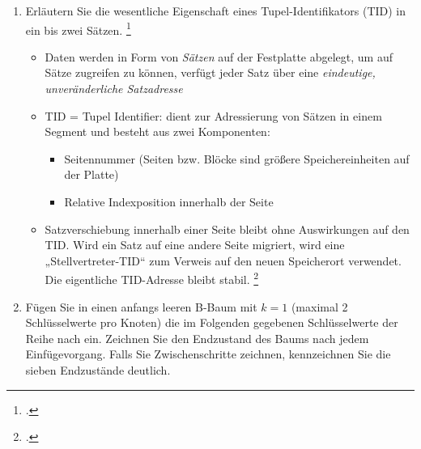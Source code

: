 \documentclass{lehramt-informatik-aufgabe}
\begin{document}

\begin{enumerate}


\item Erläutern Sie die wesentliche Eigenschaft eines
Tupel-Identifikators (TID) in ein bis zwei Sätzen.
\footcite{66114:2016:09}

\begin{liAntwort}
\begin{itemize}
\item Daten werden in Form von \emph{Sätzen} auf der Festplatte
abgelegt, um auf Sätze zugreifen zu können, verfügt jeder Satz über eine
\emph{eindeutige, unveränderliche Satzadresse}

\item TID = Tupel Identifier: dient zur Adressierung von Sätzen in einem
Segment und besteht aus zwei Komponenten:

\begin{itemize}
\item Seitennummer (Seiten bzw. Blöcke sind größere Speichereinheiten
auf der Platte)

\item Relative Indexposition innerhalb der Seite
\end{itemize}

\item Satzverschiebung innerhalb einer Seite bleibt ohne Auswirkungen
auf den TID. Wird ein Satz auf eine andere Seite migriert, wird eine
„Stellvertreter-TID“ zum Verweis auf den neuen Speicherort verwendet.
Die eigentliche TID-Adresse bleibt stabil.
\footcite[Seite 219]{kemper}
\end{itemize}
\end{liAntwort}


\item Fügen Sie in einen anfangs leeren B-Baum mit $k = 1$ (maximal 2
Schlüsselwerte pro Knoten) die im Folgenden gegebenen Schlüsselwerte der
Reihe nach ein. Zeichnen Sie den Endzustand des Baums nach jedem
Einfügevorgang. Falls Sie Zwischenschritte zeichnen, kennzeichnen Sie
die sieben Endzustände deutlich.


\end{enumerate}
\end{document}
